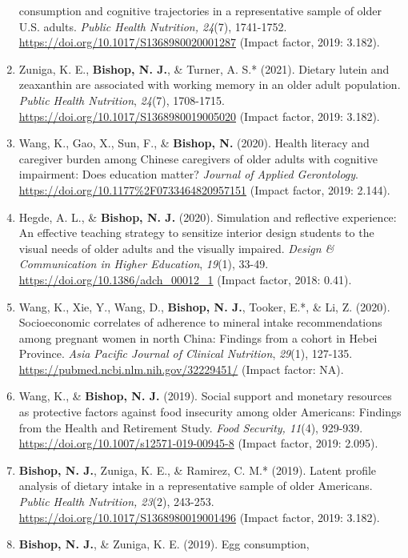 \documentclass[
]{article}
\begin{document}
\begin{enumerate}
  consumption and cognitive trajectories in a representative sample of
  older U.S. adults. \emph{Public Health Nutrition, 24}(7), 1741-1752.
  \url{https://doi.org/10.1017/S1368980020001287} (Impact factor, 2019:
  3.182).
\item
  Zuniga, K. E., \textbf{Bishop, N. J.}, \& Turner, A. S.* (2021).
  Dietary lutein and zeaxanthin are associated with working memory in an
  older adult population. \emph{Public Health Nutrition}, \emph{24}(7),
  1708-1715. \url{https://doi.org/10.1017/S1368980019005020} (Impact
  factor, 2019: 3.182).
\item
  Wang, K., Gao, X., Sun, F., \& \textbf{Bishop, N.} (2020). Health
  literacy and caregiver burden among Chinese caregivers of older adults
  with cognitive impairment: Does education matter? \emph{Journal of
  Applied Gerontology}.
  \url{https://doi.org/10.1177\%2F0733464820957151} (Impact factor,
  2019: 2.144).
\item
  Hegde, A. L., \& \textbf{Bishop, N. J.} (2020). Simulation and
  reflective experience: An effective teaching strategy to sensitize
  interior design students to the visual needs of older adults and the
  visually impaired. \emph{Design \& Communication in Higher Education},
  \emph{19}(1), 33-49. \url{https://doi.org/10.1386/adch_00012_1}
  (Impact factor, 2018: 0.41).
\item
  Wang, K., Xie, Y., Wang, D., \textbf{Bishop, N. J.}, Tooker, E.*, \&
  Li, Z. (2020). Socioeconomic correlates of adherence to mineral intake
  recommendations among pregnant women in north China: Findings from a
  cohort in Hebei Province. \emph{Asia Pacific Journal of Clinical
  Nutrition}, \emph{29}(1), 127-135.
  \url{https://pubmed.ncbi.nlm.nih.gov/32229451/} (Impact factor: NA).
\item
  Wang, K., \& \textbf{Bishop, N. J.} (2019). Social support and
  monetary resources as protective factors against food insecurity among
  older Americans: Findings from the Health and Retirement Study.
  \emph{Food Security, 11}(4), 929-939.
  \url{https://doi.org/10.1007/s12571-019-00945-8} (Impact factor, 2019:
  2.095).
\item
  \textbf{Bishop, N. J.}, Zuniga, K. E., \& Ramirez, C. M.* (2019).
  Latent profile analysis of dietary intake in a representative sample
  of older Americans. \emph{Public Health Nutrition, 23}(2), 243-253.
  \url{https://doi.org/10.1017/S1368980019001496} (Impact factor, 2019:
  3.182).
\item
  \textbf{Bishop, N. J.}, \& Zuniga, K. E. (2019). Egg consumption,

\end{enumerate}
\end{document}
